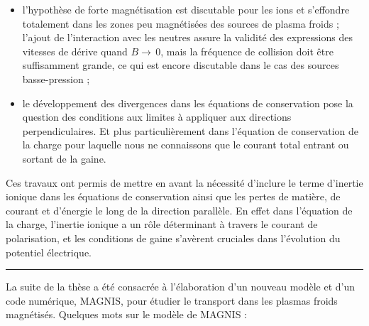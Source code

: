  \begin{itemize}
   \item l'hypothèse de forte magnétisation est discutable pour les ions
 et s'effondre totalement dans les zones peu magnétisées des sources de plasma
 froids ; l'ajout de l'interaction avec les neutres assure la validité des
 expressions des vitesses de dérive quand $B\rightarrow\,$0, mais la fréquence
 de collision doit être suffisamment grande, ce qui est encore discutable dans
 le cas des sources basse-pression ;
 \item le développement des divergences dans les équations de conservation pose
 la question des conditions aux limites à appliquer aux directions
 perpendiculaires.
 Et plus particulièrement dans l'équation de conservation de la charge pour
 laquelle nous ne connaissons que le courant total entrant ou sortant de la
 gaine. 
 \end{itemize}
   
 Ces travaux ont permis de mettre en avant la nécessité d'inclure
 le terme d'inertie ionique dans les équations de conservation ainsi que les pertes de
 matière, de courant et d'énergie le long de la direction parallèle. En effet
 dans l'équation de la charge, l'inertie ionique a un rôle déterminant à travers
 le courant de polarisation, et les conditions de gaine s'avèrent cruciales
 dans l'évolution du potentiel électrique.
 
 \begin{center}
\rule{0.6\textwidth}{1pt}
\end{center}
 
 La suite de la thèse a été consacrée à l'élaboration d'un
 nouveau modèle et d'un code numérique, MAGNIS, pour étudier le transport
 dans les plasmas froids magnétisés. Quelques mots sur le modèle de
 MAGNIS :
 
